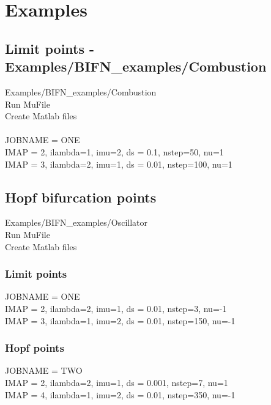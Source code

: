 \documentclass[12pt]{article}
\begin{document}
\newpage
\section{Examples}

\subsection{Limit points - Examples/BIFN\_examples/Combustion}

Examples/BIFN\_examples/Combustion \\
Run MuFile \\
Create Matlab files \\
\\
JOBNAME = ONE \\
IMAP = 2, ilambda=1, imu=2, ds = 0.1,  nstep=50,  nu=1 \\
IMAP = 3, ilambda=2, imu=1, ds = 0.01, nstep=100, nu=1 \\




\subsection{Hopf bifurcation points}

Examples/BIFN\_examples/Oscillator \\
Run MuFile \\
Create Matlab files \\

\subsubsection{Limit points}

JOBNAME = ONE \\
IMAP = 2, ilambda=2, imu=1, ds = 0.01, nstep=3,   nu=-1 \\
IMAP = 3, ilambda=1, imu=2, ds = 0.01, nstep=150, nu=-1 \\

\subsubsection{Hopf points}

JOBNAME = TWO \\
IMAP = 2, ilambda=2, imu=1, ds = 0.001, nstep=7,   nu=1 \\
IMAP = 4, ilambda=1, imu=2, ds = 0.01,  nstep=350, nu=-1
\end{document}
